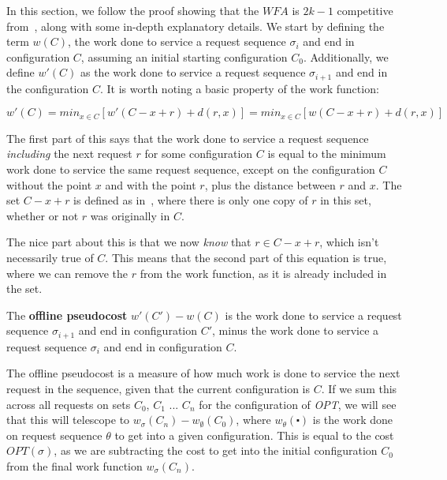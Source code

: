 In this section, we follow the proof showing that the $WFA$ is $2k-1$ competitive from~\cite{OnlineComp1998}, along with some in-depth explanatory details. We start by defining the term $w(C)$, the work done to service a request sequence $\sigma_i$ and end in configuration $C$, assuming an initial starting configuration $C_0$. Additionally, we define $w'(C)$ as the work done to service a request sequence $\sigma_{i+1}$ and end in the configuration $C$. It is worth noting a basic property of the work function:

\begin{equation*}
    \label{eq:work}
    w'(C) = min_{x \in C} [w'(C - x + r) + d(r, x)] = min_{x \in C} [w(C - x + r) + d(r, x)]
\end{equation*}

The first part of this says that the work done to service a request sequence \textit{including} the next request $r$ for some configuration $C$ is equal to the minimum work done to service the same request sequence, except on the configuration $C$ without the point $x$ and with the point $r$, plus the distance between $r$ and $x$. The set $C-x+r$ is defined as in~\cite{OnlineComp1998}, where there is only one copy of $r$ in this set, whether or not $r$ was originally in $C$. 

The nice part about this is that we now \textit{know} that $r \in C - x + r$, which isn't necessarily true of $C$. This means that the second part of this equation is true, where we can remove the $r$ from the work function, as it is already included in the set. 

\begin{definition}
    The \textbf{offline pseudocost} $w'(C') - w(C)$ is the work done to service a request sequence $\sigma_{i+1}$ and end in configuration $C'$, minus the work done to service a request sequence $\sigma_i$ and end in configuration $C$.
\end{definition}

The offline pseudocost is a measure of how much work is done to service the next request in the sequence, given that the current configuration is $C$. If we sum this across all requests on sets $C_0$, $C_1$ ... $C_n$ for the configuration of \textit{OPT}, we will see that this will telescope to $w_{\sigma}(C_n) - w_{\emptyset}(C_0)$, where $w_{\theta}(\centerdot)$ is the work done on request sequence $\theta$ to get into a given configuration. This is equal to the cost $OPT(\sigma)$, as we are subtracting the cost to get into the initial configuration $C_0$ from the final work function $w_\sigma(C_n)$.

